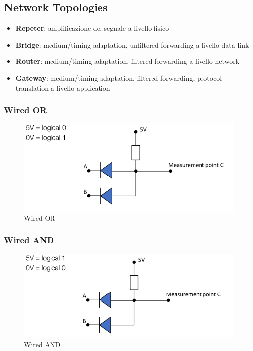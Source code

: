 \subsection{Network Topologies}

\begin{itemize}
	\item \textbf{Repeter}: amplificazione del segnale a livello fisico
	\item \textbf{Bridge}: medium/timing adaptation, unfiltered forwarding a livello data link
	\item \textbf{Router}: medium/timing adaptation, filtered forwarding a livello network
	\item \textbf{Gateway}: medium/timing adaptation, filtered forwarding, protocol translation a livello application
\end{itemize}


\subsubsection{Wired OR}

\begin{figure}[!ht]
  \begin{adjustbox}{width=0.5\columnwidth, center}
    \includegraphics{images/wired_or.png}
  \end{adjustbox}
  \caption{Wired OR}
  \label{fig:wired_or}
\end{figure}

\subsubsection{Wired AND}

\begin{figure}[!ht]
  \begin{adjustbox}{width=0.5\columnwidth, center}
    \includegraphics{images/wired_and.png}
  \end{adjustbox}
  \caption{Wired AND}
  \label{fig:wired_and}
\end{figure}


